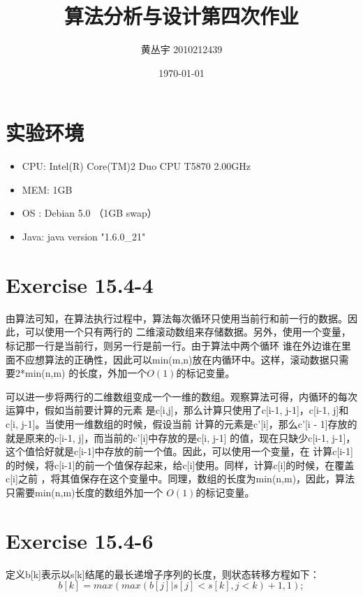 \documentclass[a4paper, 11pt]{article}
\begin{document}
\title{{\Huge 算法分析与设计第四次作业\\}}
\author{黄丛宇 2010212439}
\date{\today}

\maketitle

\section{实验环境}
\begin{itemize}
	\item CPU: Intel(R) Core(TM)2 Duo CPU T5870 2.00GHz
	\item MEM: 1GB
	\item OS : Debian 5.0 （1GB swap）
	\item Java: java version "1.6.0\_21"
\end{itemize}
\section{Exercise 15.4-4}

由算法可知，在算法执行过程中，算法每次循环只使用当前行和前一行的数据。因此，可以使用一个只有两行的
二维滚动数组来存储数据。另外，使用一个变量，标记那一行是当前行，则另一行是前一行。由于算法中两个循环
谁在外边谁在里面不应想算法的正确性，因此可以min(m,n)放在内循环中。这样，滚动数据只需要2*min(n,m)
的长度，外加一个$O(1)$的标记变量。

可以进一步将两行的二维数组变成一个一维的数组。观察算法可得，内循环的每次运算中，假如当前要计算的元素
是c[i,j]，那么计算只使用了c[i-1, j-1]，c[i-1, j]和c[i, j-1]。当使用一维数组的时候，假设当前
计算的元素是c'[i]，那么c'[i - 1]存放的就是原来的c[i-1, j]，而当前的c'[i]中存放的是c[i, j-1]
的值，现在只缺少c[i-1, j-1]，这个值恰好就是c[i-1]中存放的前一个值。因此，可以使用一个变量，在
计算c[i-1]的时候，将c[i-1]的前一个值保存起来，给c[i]使用。同样，计算c[i]的时候，在覆盖c[i]之前
，将其值保存在这个变量中。同理，数组的长度为min(n,m)，因此，算法只需要min(n,m)长度的数组外加一个
$O(1)$的标记变量。

\section{Exercise 15.4-6}

定义b[k]表示以s[k]结尾的最长递增子序列的长度，则状态转移方程如下：
\begin{displaymath}
                     b[k]=max(max(b[j]|s[j]<s[k],j<k)+1,1);
\end{displaymath}  	
\end{document}

